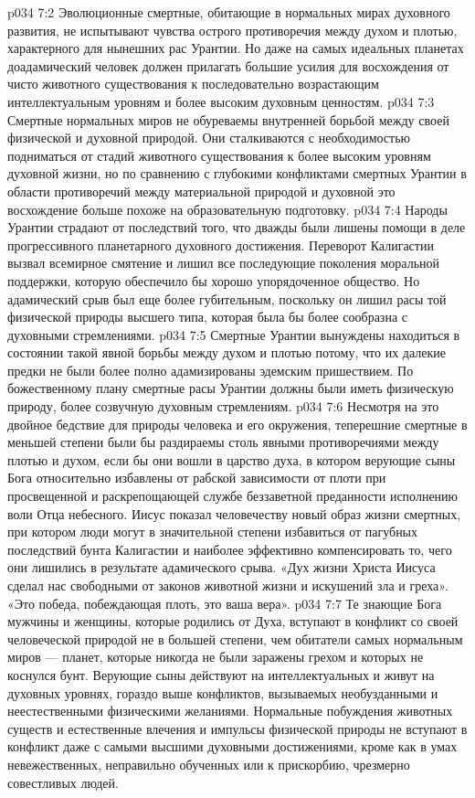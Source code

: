 \vs p034 7:2 Эволюционные смертные, обитающие в нормальных мирах духовного развития, не испытывают чувства острого противоречия между духом и плотью, характерного для нынешних рас Урантии. Но даже на самых идеальных планетах доадамический человек должен прилагать большие усилия для восхождения от чисто животного существования к последовательно возрастающим интеллектуальным уровням и более высоким духовным ценностям.
\vs p034 7:3 Смертные нормальных миров не обуреваемы внутренней борьбой между своей физической и духовной природой. Они сталкиваются с необходимостью подниматься от стадий животного существования к более высоким уровням духовной жизни, но по сравнению с глубокими конфликтами смертных Урантии в области противоречий между материальной природой и духовной это восхождение больше похоже на образовательную подготовку.
\vs p034 7:4 \pc Народы Урантии страдают от последствий того, что дважды были лишены помощи в деле прогрессивного планетарного духовного достижения. Переворот Калигастии вызвал всемирное смятение и лишил все последующие поколения моральной поддержки, которую обеспечило бы хорошо упорядоченное общество. Но адамический срыв был еще более губительным, поскольку он лишил расы той физической природы высшего типа, которая была бы более сообразна с духовными стремлениями.
\enlargethispage*{-\baselineskip}%
\vs p034 7:5 Смертные Урантии вынуждены находиться в состоянии такой явной борьбы между духом и плотью потому, что их далекие предки не были более полно адамизированы эдемским пришествием. По божественному плану смертные расы Урантии должны были иметь физическую природу, более созвучную духовным стремлениям.
\vs p034 7:6 \pc Несмотря на это двойное бедствие для природы человека и его окружения, теперешние смертные в меньшей степени были бы раздираемы столь явными противоречиями между плотью и духом, если бы они вошли в царство духа, в котором верующие сыны Бога относительно избавлены от рабской зависимости от плоти при просвещенной и раскрепощающей службе беззаветной преданности исполнению воли Отца небесного. Иисус показал человечеству новый образ жизни смертных, при котором люди могут в значительной степени избавиться от пагубных последствий бунта Калигастии и наиболее эффективно компенсировать то, чего они лишились в результате адамического срыва. «Дух жизни Христа Иисуса сделал нас свободными от законов животной жизни и искушений зла и греха». «Это победа, побеждающая плоть, это ваша вера».
\vs p034 7:7 Те знающие Бога мужчины и женщины, которые родились от Духа, вступают в конфликт со своей человеческой природой не в большей степени, чем обитатели самых нормальным миров --- планет, которые никогда не были заражены грехом и которых не коснулся бунт. Верующие сыны действуют на интеллектуальных и живут на духовных уровнях, гораздо выше конфликтов, вызываемых необузданными и неестественными физическими желаниями. Нормальные побуждения животных существ и естественные влечения и импульсы физической природы не вступают в конфликт даже с самыми высшими духовными достижениями, кроме как в умах невежественных, неправильно обученных или к прискорбию, чрезмерно совестливых людей.
